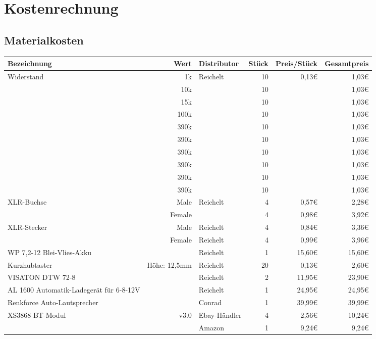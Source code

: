 \section{Kostenrechnung}	
\subsection{Materialkosten}

\begin{table}
\begin{tabularx}{\textwidth}{p{}|r|X|r|r|r}
	Bezeichnung & Wert & Distributor& Stück & Preis/Stück & Gesamtpreis\\
	\hline
	\multirow{10}{*}{Widerstand}
	& 1k	& \multirow{10}{*}{Reichelt} & 10 & \multirow{10}{*}{0,13€}	& 1,03€ \\
	& 10k	& 							 & 10 & 						& 1,03€ \\
	& 15k	& 							 & 10 & 						& 1,03€ \\
	& 100k	&							 & 10 & 						& 1,03€ \\
	& 390k	& 							 & 10 & 						& 1,03€ \\
	& 390k	&							 & 10 & 						& 1,03€ \\
	& 390k	& 							 & 10 & 						& 1,03€ \\
	& 390k	& 							 & 10 & 						& 1,03€ \\
	& 390k	& 							 & 10 & 						& 1,03€ \\
	& 390k	& 							 & 10 & 						& 1,03€ \\
	
	\hline
	\multirow{2}{*}{XLR-Buchse}
	& Male	& \multirow{2}{*}{Reichelt}	& 4	& 0,57€	& 2,28€ \\
	& Female	& 						& 4	& 0,98€	& 3,92€ \\
	
	\hline
	\multirow{2}{*}{XLR-Stecker}
	& Male	& Reichelt	& 4	& 0,84€	& 3,36€ \\
	& Female	& Reichelt	& 4	& 0,99€	& 3,96€ \\
	
	\hline
	WP 7,2-12 Blei-Vlies-Akku &  & Reichelt & 1 & 15,60€ & 15,60€\\
	
	\hline
	Kurzhubtaster & Höhe: 12,5mm  & Reichelt & 20 & 0,13€ & 2,60€ \\

	\hline
	VISATON DTW 72-8 &  & Reichelt & 2 & 11,95€ & 23,90€ \\
	
	\hline
	AL 1600 Automatik-Ladegerät für 6-8-12V &  & Reichelt & 1 & 24,95€ & 24,95€ \\

	\hline
	Renkforce Auto-Lautsprecher &  & Conrad & 1 & 39,99€ & 39,99€ \\
	
	\hline
	\multirow{2}{*}{XS3868 BT-Modul} &\multirow{2}{*}{v3.0}
	& Ebay-Händler & 4 & 2,56€ & 10,24€ \\
	& & Amazon & 1 & 9,24€ & 9,24€ \\
 	
	\hline
	
	
\end{tabularx}
\end{table}

